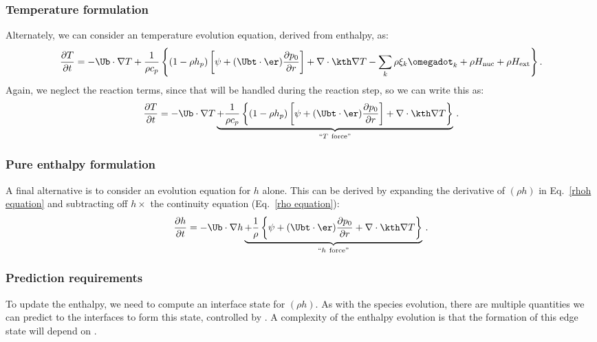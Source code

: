 \subsubsection{Temperature formulation}

Alternately, we can consider an temperature evolution equation, derived
from enthalpy, as:
\begin{equation}
\frac{\partial T}{\partial t} = -\Ub\cdot\nabla T
+ \frac{1}{\rho c_p}\left\{(1-\rho h_p)\left[\psi
+ (\Ubt \cdot \er )\frac{\partial p_0}{\partial r}\right] 
+ \nabla \cdot \kth \nabla T
- \sum_k\rho\xi_k\omegadot_k 
+ \rho H_{\rm nuc} + \rho H_{\rm ext}\right\}.
\end{equation}
Again, we neglect the reaction terms, since that will be handled during
the reaction step, so we can write this as:
\begin{equation}
\frac{\partial T}{\partial t} = -\Ub\cdot\nabla T
\underbrace{
+ \frac{1}{\rho c_p}\left\{(1-\rho h_p)\left[\psi
+ (\Ubt \cdot \er )\frac{\partial p_0}{\partial r}\right] 
+ \nabla \cdot \kth \nabla T \right \} }_{``T~\text{force''}} \, .
\label{T equation labeled}
\end{equation}

\subsubsection{Pure enthalpy formulation}

A final alternative is to consider an evolution equation for $h$
alone.  This can be derived by expanding the derivative of $(\rho h)$
in Eq.~\ref{rhoh equation} and subtracting off $h \times$ the
continuity equation (Eq.~\ref{rho equation}):
\begin{equation}
\frac{\partial h}{\partial t} = -\Ub \cdot \nabla h 
\underbrace{+ \frac{1}{\rho}
\left \{ \psi + (\Ubt \cdot \er )\frac{\partial p_0}{\partial r}
+ \nabla \cdot \kth \nabla T \right \} }_{``h~\text{force''}} \, .
\label{h equation labeled}
\end{equation}

\subsubsection{Prediction requirements}

To update the enthalpy, we need to compute an interface state for
$(\rho h)$.  As with the species evolution, there are multiple
quantities we can predict to the interfaces to form this state,
controlled by .  A complexity of the
enthalpy evolution is that the formation of this edge state will
depend on .  

